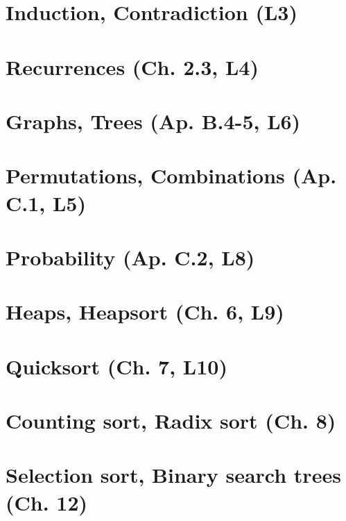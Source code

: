 \documentclass{article}
\begin{document}
\section{Induction, Contradiction (L3)} %

\newpage

\section{Recurrences (Ch. 2.3, L4)} %

\newpage

\section{Graphs, Trees (Ap. B.4-5, L6)} %

\newpage

\section{Permutations, Combinations (Ap. C.1, L5)} %

\newpage

\section{Probability (Ap. C.2, L8)} %

\newpage


\section{Heaps, Heapsort (Ch. 6, L9)} %

\newpage

\section{Quicksort (Ch. 7, L10)} %

\newpage

\section{Counting sort, Radix sort (Ch. 8)}

\newpage


\section{Selection sort, Binary search trees (Ch. 12)}

\newpage
\end{document}
